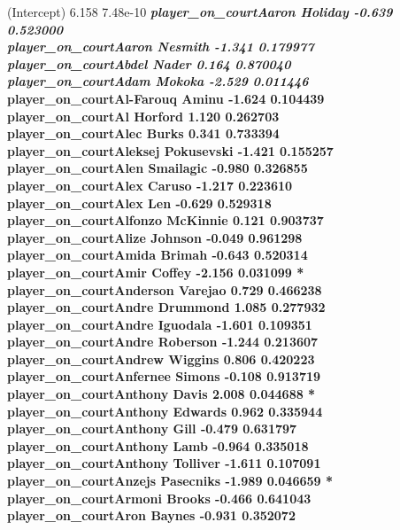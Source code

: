 \documentclass[
  landscape]{article}
\begin{document}
(Intercept) 6.158 7.48e-10 \textbf{\emph{ player\_on\_courtAaron Holiday
-0.639 0.523000\\
player\_on\_courtAaron Nesmith -1.341 0.179977\\
player\_on\_courtAbdel Nader 0.164 0.870040\\
player\_on\_courtAdam Mokoka -2.529 0.011446 }\\
player\_on\_courtAl-Farouq Aminu -1.624 0.104439\\
player\_on\_courtAl Horford 1.120 0.262703\\
player\_on\_courtAlec Burks 0.341 0.733394\\
player\_on\_courtAleksej Pokusevski -1.421 0.155257\\
player\_on\_courtAlen Smailagic -0.980 0.326855\\
player\_on\_courtAlex Caruso -1.217 0.223610\\
player\_on\_courtAlex Len -0.629 0.529318\\
player\_on\_courtAlfonzo McKinnie 0.121 0.903737\\
player\_on\_courtAlize Johnson -0.049 0.961298\\
player\_on\_courtAmida Brimah -0.643 0.520314\\
player\_on\_courtAmir Coffey -2.156 0.031099 *\\
player\_on\_courtAnderson Varejao 0.729 0.466238\\
player\_on\_courtAndre Drummond 1.085 0.277932\\
player\_on\_courtAndre Iguodala -1.601 0.109351\\
player\_on\_courtAndre Roberson -1.244 0.213607\\
player\_on\_courtAndrew Wiggins 0.806 0.420223\\
player\_on\_courtAnfernee Simons -0.108 0.913719\\
player\_on\_courtAnthony Davis 2.008 0.044688 *\\
player\_on\_courtAnthony Edwards 0.962 0.335944\\
player\_on\_courtAnthony Gill -0.479 0.631797\\
player\_on\_courtAnthony Lamb -0.964 0.335018\\
player\_on\_courtAnthony Tolliver -1.611 0.107091\\
player\_on\_courtAnzejs Pasecniks -1.989 0.046659 *\\
player\_on\_courtArmoni Brooks -0.466 0.641043\\
player\_on\_courtAron Baynes -0.931 0.352072\\
}
\end{document}
